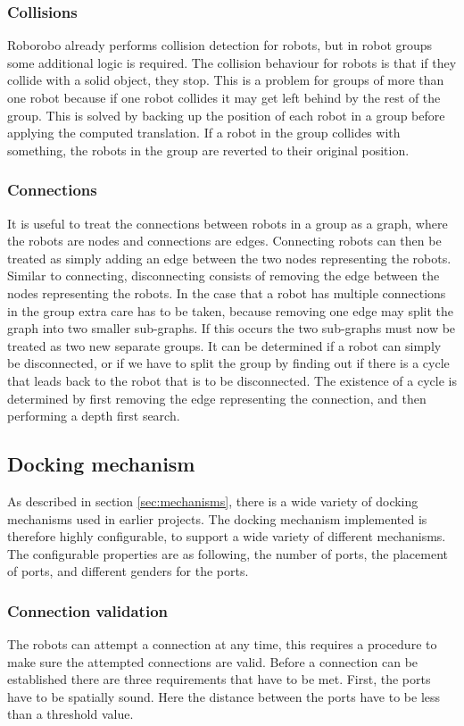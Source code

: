 \subsubsection{Collisions}
Roborobo already performs collision detection for robots, but in robot groups some additional logic is required.
The collision behaviour for robots is that if they collide with a solid object, they stop.
This is a problem for groups of more than one robot because if one robot collides it may get left behind by the rest of the group.
This is solved by backing up the position of each robot in a group before applying the computed translation.
If a robot in the group collides with something, the robots in the group are reverted to their original position.

\subsubsection{Connections}
It is useful to treat the connections between robots in a group as a graph, where the robots are nodes and connections are edges.
Connecting robots can then be treated as simply adding an edge between the two nodes representing the robots.
Similar to connecting, disconnecting consists of removing the edge between the nodes representing the robots.
In the case that a robot has multiple connections in the group extra care has to be taken, because removing one edge may split the graph into two smaller sub-graphs.
If this occurs the two sub-graphs must now be treated as two new separate groups.
It can be determined if a robot can simply be disconnected, or if we have to split the group by finding out if there is a cycle that leads back to the robot that is to be disconnected.
The existence of a cycle is determined by first removing the edge representing the connection, and then performing a depth first search.
	
	 
\subsection{Docking mechanism}
As described in section \ref{sec:mechanisms}, there is a wide variety of docking mechanisms used in earlier projects.
The docking mechanism implemented is therefore highly configurable, to support a wide variety of different mechanisms.
The configurable properties are as following, the number of ports, the placement of ports, and different genders for the ports. 
	
\subsubsection{Connection validation}
The robots can attempt a connection at any time, this requires a procedure to make sure the attempted connections are valid.
Before a connection can be established there are three requirements that have to be met.
First, the ports have to be spatially sound. 
Here the distance between the ports have to be less than a threshold value.
		
